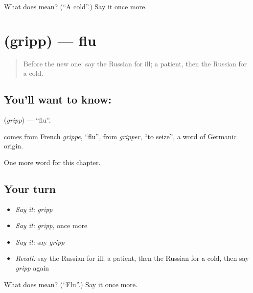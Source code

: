 \begin{tcolorbox}[breakable,colback=teal!4,colframe=teal!35!black,title={Before you move on}]
What does  mean? (\textquotedblleft{}A cold\textquotedblright{}.) Say it once more.
\end{tcolorbox}
\section[\texorpdfstring{\ru{грипп} (gripp)}{грипп (gripp)}]{ (gripp) — flu}

\label{lesson:RU-C147-gripp}



\begin{quote}
Before the new one: say the Russian for ill; a patient, then the Russian for a cold.
\end{quote}

\subsection*{You'll want to know: }
\textbf{} (\emph{gripp}) — \textquotedblleft{}flu\textquotedblright{}.

\begin{cousinweb}
\textbf{} comes from French \emph{grippe}, \textquotedblleft{}flu\textquotedblright{}, from \emph{gripper}, \textquotedblleft{}to seize\textquotedblright{}, a word of Germanic origin.
\end{cousinweb}

\begin{grammarlens}[title={What you've built}]
One more word for this chapter.
\end{grammarlens}

\subsection*{Your turn}
\begin{itemize}
\raggedright
  \item \emph{Say it:} \emph{gripp}
  \item \emph{Say it:} \emph{gripp}, once more
  \item \emph{Say it:} say \emph{gripp}
  \item \emph{Recall:} say the Russian for ill; a patient, then the Russian for a cold, then say \emph{gripp} again
\end{itemize}

\begin{tcolorbox}[breakable,colback=teal!4,colframe=teal!35!black,title={Before you move on}]
What does  mean? (\textquotedblleft{}Flu\textquotedblright{}.) Say it once more.
\end{tcolorbox}
